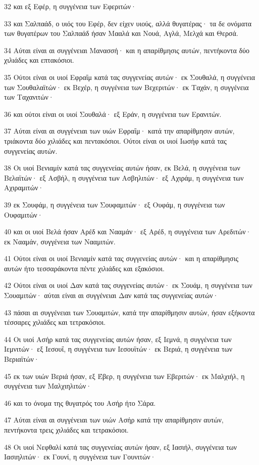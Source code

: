 \par 32 και εξ Εφέρ, η συγγένεια των Εφεριτών·
\par 33 και Σαλπαάδ, ο υιός του Εφέρ, δεν είχεν υιούς, αλλά θυγατέρας· τα δε ονόματα των θυγατέρων του Σαλπαάδ ήσαν Μααλά και Νουά, Αγλά, Μελχά και Θερσά.
\par 34 Αύται είναι αι συγγένειαι Μανασσή· και η απαρίθμησις αυτών, πεντήκοντα δύο χιλιάδες και επτακόσιοι.
\par 35 Ούτοι είναι οι υιοί Εφραΐμ κατά τας συγγενείας αυτών· εκ Σουθαλά, η συγγένεια των Σουθαλαϊτών· εκ Βεχέρ, η συγγένεια των Βεχεριτών· εκ Ταχάν, η συγγένεια των Ταχανιτών·
\par 36 και ούτοι είναι οι υιοί Σουθαλά· εξ Εράν, η συγγένεια των Ερανιτών.
\par 37 Αύται είναι αι συγγένειαι των υιών Εφραΐμ· κατά την απαρίθμησιν αυτών, τριάκοντα δύο χιλιάδες και πεντακόσιοι. Ούτοι είναι οι υιοί Ιωσήφ κατά τας συγγενείας αυτών.
\par 38 Οι υιοί Βενιαμίν κατά τας συγγενείας αυτών ήσαν, εκ Βελά, η συγγένεια των Βελαϊτών· εξ Ασβήλ, η συγγένεια των Ασβηλιτών· εξ Αχιράμ, η συγγένεια των Αχιραμιτών·
\par 39 εκ Σουφάμ, η συγγένεια των Σουφαμιτών· εξ Ουφάμ, η συγγένεια των Ουφαμιτών·
\par 40 και οι υιοί Βελά ήσαν Αρέδ και Νααμάν· εξ Αρέδ, η συγγένεια των Αρεδιτών· εκ Νααμάν, συγγένεια των Νααμιτών.
\par 41 Ούτοι είναι οι υιοί Βενιαμίν κατά τας συγγενείας αυτών· και η απαρίθμησις αυτών ήτο τεσσαράκοντα πέντε χιλιάδες και εξακόσιοι.
\par 42 Ούτοι είναι οι υιοί Δαν κατά τας συγγενείας αυτών· εκ Σουάμ, η συγγένεια των Σουαμιτών· αύται είναι αι συγγένειαι Δαν κατά τας συγγενείας αυτών·
\par 43 πάσαι αι συγγένειαι των Σουαμιτών, κατά την απαρίθμησιν αυτών, ήσαν εξήκοντα τέσσαρες χιλιάδες και τετρακόσιοι.
\par 44 Οι υιοί Ασήρ κατά τας συγγενείας αυτών ήσαν, εξ Ιεμνά, η συγγένεια των Ιεμνιτών· εξ Ιεσουΐ, η συγγένεια των Ιεσουϊτών· εκ Βεριά, η συγγένεια των Βεριαϊτών·
\par 45 εκ των υιών Βεριά ήσαν, εξ Έβερ, η συγγένεια των Εβεριτών· εκ Μαλχιήλ, η συγγένεια των Μαλχιηλιτών·
\par 46 και το όνομα της θυγατρός του Ασήρ ήτο Σάρα.
\par 47 Αύται είναι αι συγγένειαι των υιών Ασήρ κατά την απαρίθμησιν αυτών, πεντήκοντα τρεις χιλιάδες και τετρακόσιοι.
\par 48 Οι υιοί Νεφθαλί κατά τας συγγενείας αυτών ήσαν, εξ Ιασιήλ, συγγένεια των Ιασιηλιτών· εκ Γουνί, η συγγένεια των Γουνιτών·

